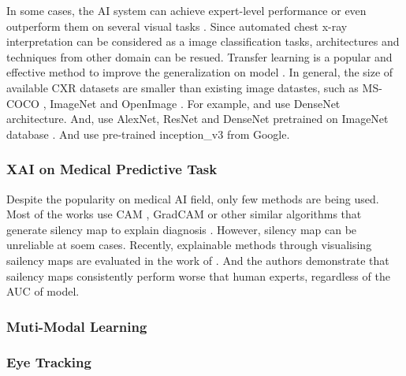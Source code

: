 In some cases, the AI system can achieve expert-level performance or even outperform them on several visual tasks \citep{Rajpurkar2017CheXNet, Yuan2020DAM, Tang2020AbnormalityCXRCNN}.  Since automated chest x-ray interpretation can be considered as a image classification tasks, architectures and techniques from other domain can be resued. Transfer learning is a popular and effective method to improve the generalization on model \citep{Zhuang2019TransferLearningSurvey}. In general, the size of available CXR datasets are smaller than existing image datastes, such as MS-COCO \citep{Lin2014MSCOCO}, ImageNet \citep{Deng2009ImageNet} and OpenImage \citep{Kuznetsova2020OpenImages}. For example, \citet{Yuan2020DAM} and \citet{Cohen2020Covid19} use DenseNet\citep{Huang2016DenseNet} architecture. And, \citet{Dunnmon2019CNNOnCXRAssessment} use AlexNet\citep{Alex2012AlexNet}, ResNet \citep{He2015ResNet} and DenseNet pretrained on ImageNet database \citep{Deng2009ImageNet}. And \citet{Yates2018RedDotCXR} use pre-trained inception_v3\citep{Szegedy2015InceptionV3} from Google.

\subsubsection{XAI on Medical Predictive Task}


Despite the popularity on medical AI field, only few methods are being used. Most of the works use CAM \citep{Zhou2015CAM}, GradCAM\citep{Selvaraju2017GradCAM} or other similar algorithms that generate silency map to explain diagnosis \citep{Teixeira2021LIMEAndGradCAMOnCXR, Rajpurkar2018CheXNeXt, Rajpurkar2017CheXNet, Brunese2020ExplainableCovid19, Hou2021ExplainableCovid19}. However, silency map can be unreliable at soem cases. Recently, explainable methods through visualising sailency maps are evaluated in the work of \citep{Saporta2021BechmarkingSaliencyMethods}. And the authors demonstrate that sailency maps consistently perform worse that human experts, regardless of the AUC of model.

\subsubsection{Muti-Modal Learning}




\subsubsection{Eye Tracking}

